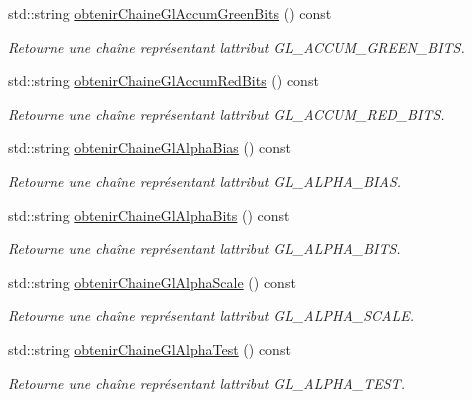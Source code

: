 \begin{DoxyCompactItemize}
std\+::string \hyperlink{group__utilitaire_gae677b60d2113b1843ba4d2c92fe34c34}{obtenir\+Chaine\+Gl\+Accum\+Green\+Bits} () const 
\begin{DoxyCompactList}\small\item\em Retourne une chaîne représentant l\textquotesingle{}attribut G\+L\+\_\+\+A\+C\+C\+U\+M\+\_\+\+G\+R\+E\+E\+N\+\_\+\+B\+I\+T\+S. \end{DoxyCompactList}\item 
std\+::string \hyperlink{group__utilitaire_ga3405a98de14c30d7a57d954d298b6376}{obtenir\+Chaine\+Gl\+Accum\+Red\+Bits} () const 
\begin{DoxyCompactList}\small\item\em Retourne une chaîne représentant l\textquotesingle{}attribut G\+L\+\_\+\+A\+C\+C\+U\+M\+\_\+\+R\+E\+D\+\_\+\+B\+I\+T\+S. \end{DoxyCompactList}\item 
std\+::string \hyperlink{group__utilitaire_gaf54d9525863334d2d2fd362c7043a4be}{obtenir\+Chaine\+Gl\+Alpha\+Bias} () const 
\begin{DoxyCompactList}\small\item\em Retourne une chaîne représentant l\textquotesingle{}attribut G\+L\+\_\+\+A\+L\+P\+H\+A\+\_\+\+B\+I\+A\+S. \end{DoxyCompactList}\item 
std\+::string \hyperlink{group__utilitaire_ga7ea311e8cfd6aee3cb19e2041b2ba132}{obtenir\+Chaine\+Gl\+Alpha\+Bits} () const 
\begin{DoxyCompactList}\small\item\em Retourne une chaîne représentant l\textquotesingle{}attribut G\+L\+\_\+\+A\+L\+P\+H\+A\+\_\+\+B\+I\+T\+S. \end{DoxyCompactList}\item 
std\+::string \hyperlink{group__utilitaire_ga3b85b93cd7e5d1f12a225f28ece00696}{obtenir\+Chaine\+Gl\+Alpha\+Scale} () const 
\begin{DoxyCompactList}\small\item\em Retourne une chaîne représentant l\textquotesingle{}attribut G\+L\+\_\+\+A\+L\+P\+H\+A\+\_\+\+S\+C\+A\+L\+E. \end{DoxyCompactList}\item 
std\+::string \hyperlink{group__utilitaire_ga9fd2e2270997cf027e38f6a7b8d621a8}{obtenir\+Chaine\+Gl\+Alpha\+Test} () const 
\begin{DoxyCompactList}\small\item\em Retourne une chaîne représentant l\textquotesingle{}attribut G\+L\+\_\+\+A\+L\+P\+H\+A\+\_\+\+T\+E\+S\+T. \end{DoxyCompactList}\item 

\end{DoxyCompactItemize}
